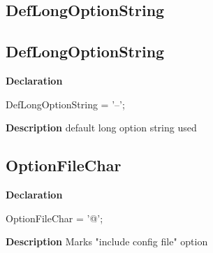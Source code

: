 \documentclass{report}
\newif\ifpdf
\begin{document}
\subsection*{\large{\textbf{DefLongOptionString}}\normalsize\hspace{1ex}\hrulefill}
\else
\subsection*{DefLongOptionString}
\fi
\label{PasDoc_OptionParser-DefLongOptionString}
\begin{list}{}{
\setlength{\itemindent}{0cm}
\setlength{\listparindent}{0cm}
\setlength{\leftmargin}{\evensidemargin}
\addtolength{\leftmargin}{\tmplength}
\settowidth{\labelsep}{X}
\addtolength{\leftmargin}{\labelsep}
\setlength{\labelwidth}{\tmplength}
}
\item[\textbf{Declaration}\hfill]
\ifpdf
\begin{flushleft}
\fi
\begin{ttfamily}
DefLongOptionString = '--';\end{ttfamily}

\ifpdf
\end{flushleft}
\fi

\par
\item[\textbf{Description}]
default long option string used

\end{list}
\ifpdf
\subsection*{\large{\textbf{OptionFileChar}}\normalsize\hspace{1ex}\hrulefill}
\else
\subsection*{OptionFileChar}
\fi
\label{PasDoc_OptionParser-OptionFileChar}
\begin{list}{}{
\setlength{\itemindent}{0cm}
\setlength{\listparindent}{0cm}
\setlength{\leftmargin}{\evensidemargin}
\addtolength{\leftmargin}{\tmplength}
\settowidth{\labelsep}{X}
\addtolength{\leftmargin}{\labelsep}
\setlength{\labelwidth}{\tmplength}
}
\item[\textbf{Declaration}\hfill]
\ifpdf
\begin{flushleft}
\fi
\begin{ttfamily}
OptionFileChar = '@';\end{ttfamily}

\ifpdf
\end{flushleft}
\fi

\par
\item[\textbf{Description}]
Marks "include config file" option

\end{list}
\ifpdf
\end{document}
